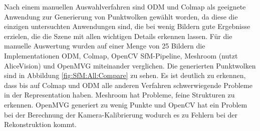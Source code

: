 \documentclass[12pt,titlepage, twoside]{article}
\begin{document}
Nach einem manuellen Auswahlverfahren sind ODM und Colmap als geeignete Anwendung zur Generierung von Punktwolken gewählt worden, 
da diese die einzigen untersuchten Anwendungen sind, die bei wenig Bildern gute Ergebnisse erzielen, die die Szene mit allen wichtigen Details erkennen lassen.
Für die manuelle Auswertung wurden auf einer Menge von 25 Bildern die Implementationen ODM, Colmap, OpenCV SfM-Pipeline, Meshroom (nutzt AliceVision) und OpenMVG miteinander verglichen. Die generierten Punktwolken sind in Abbildung \ref{fig:SfM:All:Compare} zu sehen.
Es ist deutlich zu erkennen, dass bis auf Colmap und ODM alle anderen Verfahren schwerwiegende Probleme in der Representation haben. Meshroom hat Probleme, feine Strukturen zu erkennen. 
OpenMVG generiert zu wenig Punkte und OpenCV hat ein Problem bei der Berechnung der Kamera-Kalibrierung wodurch es zu Fehlern bei der Rekonstruktion kommt.
\end{document}
